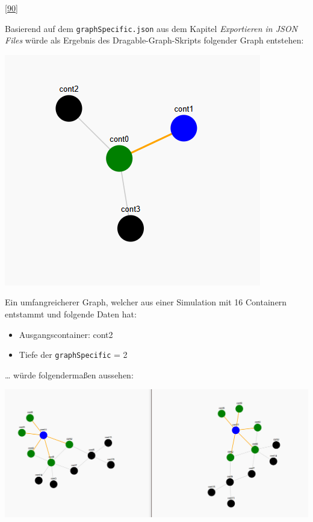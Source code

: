 \documentclass[
    headings=optiontotocandhead,%
    twoside,
    numbers=noenddot,%
    12pt, %
    titlepage, %
    parskip=full, %
    listof=leveldown, 
    numbers=noenddot, %
    a4paper,DIV=14,
    BCOR=15mm,
]{scrbook}
\newcommand{\passthrough}[1]{#1}
\let\origfigure=\figure
\let\endorigfigure=\endfigure
\renewenvironment{figure}[1][]{%
   \origfigure[H]
}{%
   \endorigfigure
}
\providecommand{\tightlist}{%
  \setlength{\itemsep}{0pt}\setlength{\parskip}{0pt}}
\begin{document}
{[}\protect\hyperlink{ref-gpt-D3jsDGScript}{90}{]}

Basierend auf dem \passthrough{\lstinline!graphSpecific.json!} aus dem
Kapitel \emph{Exportieren in JSON Files} würde als Ergebnis des
Dragable-Graph-Skripts folgender Graph entstehen:

\begin{figure}
\centering
\includegraphics{img/Gekle/DG-Example.png}
\caption{Dragable Graph basierend auf graphSpecific aus vorhergehenden
Kapitel}
\end{figure}

Ein umfangreicherer Graph, welcher aus einer Simulation mit 16
Containern entstammt und folgende Daten hat:

\begin{itemize}
\tightlist
\item
  Ausgangscontainer: cont2
\item
  Tiefe der \passthrough{\lstinline!graphSpecific!} = 2
\end{itemize}

\ldots{} würde folgendermaßen aussehen:

\begin{figure}
\centering
\includegraphics{img/Gekle/DG-Extended.png}
\caption{Umfangreicherer Dragable Graph in zwei Positionen}
\end{figure}
\end{document}
